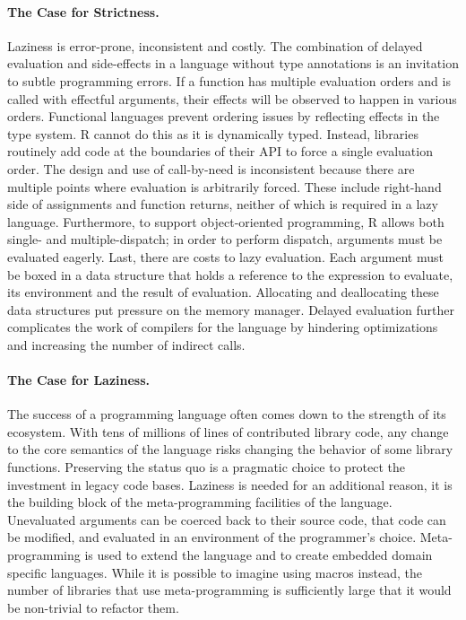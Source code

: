 \documentclass[review,nonacm,screen,acmsmall,anonymous=true]{acmart}
\begin{document}
\paragraph{The Case for Strictness.} Laziness is error-prone, inconsistent
and costly. The combination of delayed evaluation and side-effects in a language
without type annotations is an invitation to subtle programming errors. If a
function has multiple evaluation orders and is called with effectful arguments,
their effects will be observed to happen in various orders. Functional languages
prevent ordering issues by reflecting effects in the type system. R cannot do
this as it is dynamically typed. Instead, libraries routinely add code at the
boundaries of their API to force a single evaluation order. The design and use
of call-by-need is inconsistent because there are multiple points where
evaluation is arbitrarily forced. These include right-hand side of assignments
and function returns, neither of which is required in a lazy language.
Furthermore, to support object-oriented programming, R allows both single- and
multiple-dispatch; in order to perform dispatch, arguments must be evaluated
eagerly. Last, there are costs to lazy evaluation. Each argument must be boxed
in a data structure that holds a reference to the expression to evaluate, its
environment and the result of evaluation. Allocating and deallocating these data
structures put pressure on the memory manager. Delayed evaluation further
complicates the work of compilers for the language by hindering optimizations
and increasing the number of indirect calls.

\paragraph{The Case for Laziness.} The success of a programming language
often comes down to the strength of its ecosystem. With tens of millions of
lines of contributed library code, any change to the core semantics of the
language risks changing the behavior of some library functions. Preserving the
status quo is a pragmatic choice to protect the investment in legacy code bases.
Laziness is needed for an additional reason, it is the building block of the
meta-programming facilities of the language. Unevaluated arguments can be
coerced back to their source code, that code can be modified, and evaluated in
an environment of the programmer's choice. Meta-programming is used to extend
the language and to create embedded domain specific languages. While it is
possible to imagine using macros instead, the number of libraries that use
meta-programming is sufficiently large that it would be non-trivial to refactor
them.
\end{document}
